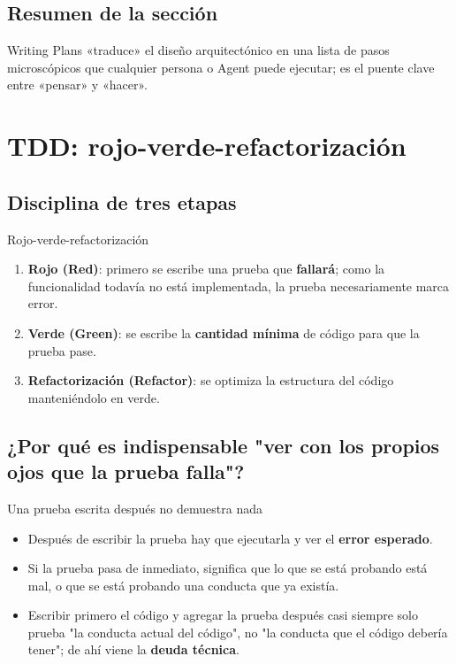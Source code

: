 \documentclass[a4paper]{article}
\begin{document}
\subsection{Resumen de la sección}

Writing Plans «traduce» el diseño arquitectónico en una lista de pasos microscópicos que cualquier persona o Agent puede ejecutar; es el puente clave entre «pensar» y «hacer».

\section{TDD: rojo-verde-refactorización}

\subsection{Disciplina de tres etapas}

\begin{importantbox}{Rojo-verde-refactorización}
\begin{enumerate}
    \item \textbf{Rojo (Red)}: primero se escribe una prueba que \textbf{fallará}; como la funcionalidad todavía no está implementada, la prueba necesariamente marca error.
    \item \textbf{Verde (Green)}: se escribe la \textbf{cantidad mínima} de código para que la prueba pase.
    \item \textbf{Refactorización (Refactor)}: se optimiza la estructura del código manteniéndolo en verde.
\end{enumerate}
\end{importantbox}

\subsection{¿Por qué es indispensable "ver con los propios ojos que la prueba falla"?}

\begin{warningbox}{Una prueba escrita después no demuestra nada}
\begin{itemize}
    \item Después de escribir la prueba hay que ejecutarla y ver el \textbf{error esperado}.
    \item Si la prueba pasa de inmediato, significa que lo que se está probando está mal, o que se está probando una conducta que ya existía.
    \item Escribir primero el código y agregar la prueba después casi siempre solo prueba "la conducta actual del código", no "la conducta que el código debería tener"; de ahí viene la \textbf{deuda técnica}.
\end{itemize}
\end{warningbox}
\end{document}
